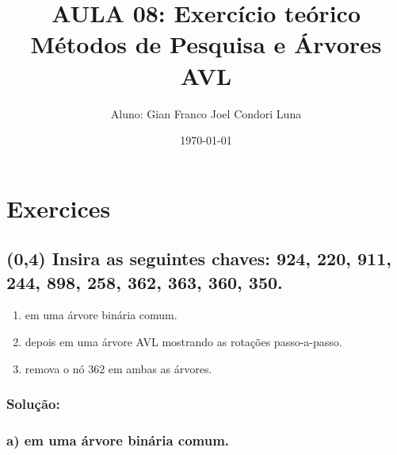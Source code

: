 \documentclass{article}
\title{AULA 08: Exercício teórico Métodos de Pesquisa e Árvores AVL}
\author{Aluno: Gian Franco Joel Condori Luna}
\date{\today}
\begin{document}
\maketitle

\section*{Exercices}
\setcounter{section}{1}
\subsection {(0,4) Insira as seguintes chaves: {924, 220, 911, 244, 898, 258, 362, 363, 360, 350}.}

\begin{enumerate}[label=\alph*)]
  \item em uma árvore binária comum.
  \item depois em uma árvore AVL mostrando as rotações passo-a-passo.
  \item remova o nó 362 em ambas as árvores.
\end{enumerate}

\subsubsection{Solução:}

\subsubsection{a) em uma árvore binária comum.}
\end{document}
